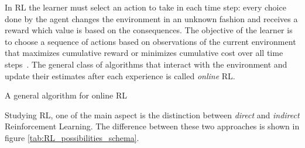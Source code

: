 In RL the learner must select an action to take in each time step: every choice done by the agent changes the environment in an unknown fashion and receives a reward which value is based on the consequences. The objective of the learner is to choose a sequence of actions based on observations of the current environment that maximizes cumulative reward or minimizes cumulative cost over all time steps~\cite{LiMalik}. The general class of algorithms that interact with the environment and update their estimates after each experience is called \textit{online} RL.

\begin{algorithm}
	\caption{A general algorithm for online RL~\cite{wiering2012reinforcement}}
\end{algorithm}

Studying RL, one of the main aspect is the distinction between \textit{direct} and \textit{indirect} Reinforcement Learning. The difference between these two approaches is shown in figure \ref{tab:RL_possibilities_schema}. \\

\begin{table}[h!]
	\caption{RL's approaches classification.}
	\label{tab:RL_possibilities_schema}
\end{table}

